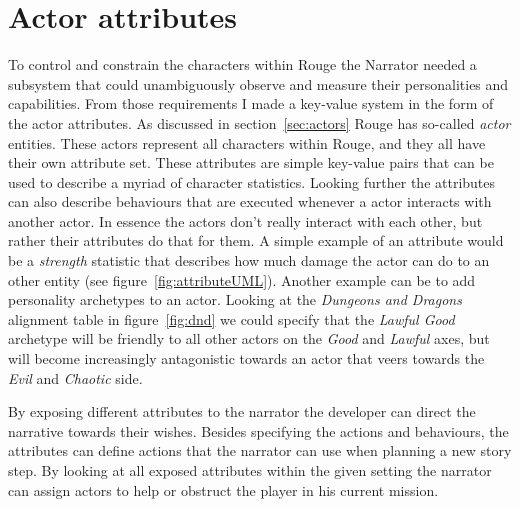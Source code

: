 \section{Actor attributes}
To control and constrain the characters within Rouge the Narrator needed a subsystem that could unambiguously observe and measure their personalities and capabilities. 
From those requirements I made a key-value system in the form of the actor attributes.
As discussed in section~\ref{sec:actors} Rouge has so-called \textit{actor} entities. These actors represent all characters within Rouge, and they all have their own attribute set. 
These attributes are simple key-value pairs that can be used to describe a myriad of character statistics. 
Looking further the attributes can also describe behaviours that are executed whenever a actor interacts with another actor.
In essence the actors don't really interact with each other, but rather their attributes do that for them.
A simple example of an attribute would be a \textit{strength} statistic that describes how much damage the actor can do to an other entity (see figure~\ref{fig:attributeUML}).
Another example can be to add personality archetypes to an actor.
Looking at the \textit{Dungeons and Dragons} alignment table in figure~\ref{fig:dnd} we could specify that the \textit{Lawful Good} archetype will be friendly to all other actors on the \textit{Good} and \textit{Lawful} axes, but will become increasingly antagonistic towards an actor that veers towards the \textit{Evil} and \textit{Chaotic} side.

By exposing different attributes to the narrator the developer can direct the narrative towards their wishes.
Besides specifying the actions and behaviours, the attributes can define actions that the narrator can use when planning a new story step. By looking at all exposed attributes within the given setting the narrator can assign actors to help or obstruct the player in his current mission.

